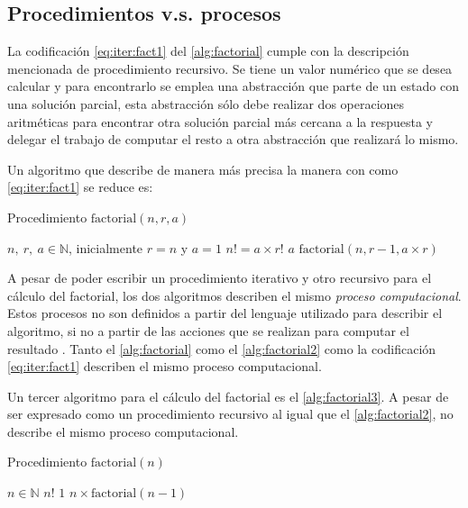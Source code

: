\subsection{Procedimientos v.s. procesos}
\label{sec:procedimientos-procesos}

La codificación \eqref{eq:iter:fact1} del \autoref{alg:factorial} cumple con la descripción mencionada de procedimiento recursivo. Se tiene un valor numérico que se desea calcular y para encontrarlo se emplea una abstracción que parte de un estado con una solución parcial, esta abstracción sólo debe realizar dos operaciones aritméticas para encontrar otra solución parcial más cercana a la respuesta y delegar el trabajo de computar el resto a otra abstracción que realizará lo mismo.

Un algoritmo que describe de manera más precisa la manera con como \eqref{eq:iter:fact1} se reduce es:

\begin{algorithm}
  \caption{Procedimiento $ \mathrm{factorial}(n,r,a) $}
  \label{alg:factorial2}
  \begin{algorithmic}
    \REQUIRE $ n,\ r,\ a\in \mathbb{N} $, inicialmente $ r=n $ y $ a=1 $
    \ENSURE $ n! = a\times r! $
    \RETURN $ a $
    \ELSE
    \RETURN $ \mathrm{factorial}(n,r-1,a\times r) $
    \ENDIF
  \end{algorithmic}
\end{algorithm}

A pesar de poder escribir un procedimiento iterativo y otro recursivo para el cálculo del factorial, los dos algoritmos describen el mismo \emph{proceso computacional}. Estos procesos no son definidos a partir del lenguaje utilizado para describir el algoritmo, si no a partir de las acciones que se realizan para computar el resultado \cite{AbelsonSussman:Wizard}. Tanto el \autoref{alg:factorial} como el \autoref{alg:factorial2} como la codificación \eqref{eq:iter:fact1} describen el mismo proceso computacional.

Un tercer algoritmo para el cálculo del factorial es el \autoref{alg:factorial3}. A pesar de ser expresado como un procedimiento recursivo al igual que el \autoref{alg:factorial2}, no describe el mismo proceso computacional.

\begin{algorithm}
  \caption{Procedimiento $ \mathrm{factorial}(n) $}
  \label{alg:factorial3}
  \begin{algorithmic}
    \REQUIRE $ n\in \mathbb{N} $
    \ENSURE $ n! $
    \RETURN $ 1 $
    \ELSE
    \RETURN $ n\times \mathrm{factorial}(n-1) $
    \ENDIF
  \end{algorithmic}
\end{algorithm}

